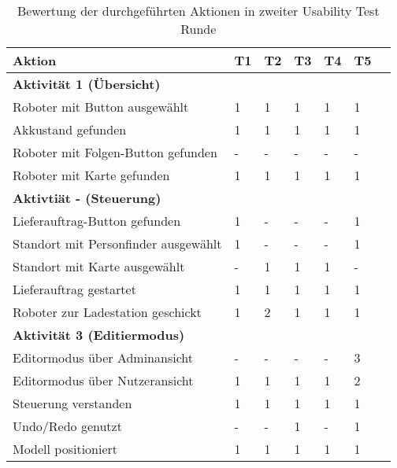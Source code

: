 \begin{table}[H]
    \caption{Bewertung der durchgeführten Aktionen in zweiter Usability Test Runde}\label{tbl:2ndUsabilityTestsActions}
    \begin{tabular}{l||llllll}
        Aktion                              & T1    & T2    & T3    & T4    & T5    \\ \hline
        \textbf{Aktivität 1 (Übersicht)}    &       &       &       &       &       \\
        Roboter mit Button ausgewählt       & 1     & 1     & 1     & 1     & 1     \\
        Akkustand gefunden                  & 1     & 1     & 1     & 1     & 1     \\
        Roboter mit Folgen-Button gefunden  & -     & -     & -     & -     & -     \\
        Roboter mit Karte gefunden          & 1     & 1     & 1     & 1     & 1     \\ \hline
        \textbf{Aktivtiät - (Steuerung)}    &       &       &       &       &       \\
        Lieferauftrag-Button gefunden       & 1     & -     & -     & -     & 1     \\
        Standort mit Personfinder ausgewählt& 1     & -     & -     & -     & 1     \\
        Standort mit Karte ausgewählt       & -     & 1     & 1     & 1     & -     \\
        Lieferauftrag gestartet             & 1     & 1     & 1     & 1     & 1     \\
        Roboter zur Ladestation geschickt   & 1     & 2     & 1     & 1     & 1     \\ \hline
        \textbf{Aktivität 3 (Editiermodus)} &       &       &       &       &       \\
        Editormodus über Adminansicht       & -     & -     & -     & -     & 3     \\
        Editormodus über Nutzeransicht      & 1     & 1     & 1     & 1     & 2     \\
        Steuerung verstanden                & 1     & 1     & 1     & 1     & 1     \\
        Undo/Redo genutzt                   & -     & -     & 1     & -     & 1     \\
        Modell positioniert                 & 1     & 1     & 1     & 1     & 1     \\
    \end{tabular}
\end{table}

